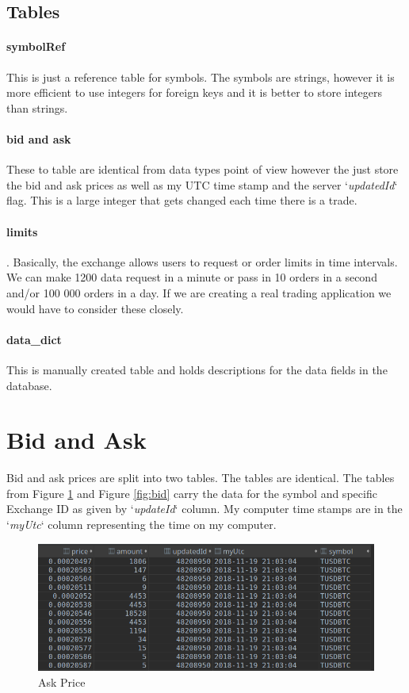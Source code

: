\documentclass[12pt]{article}
\begin{document}
\subsection*{Tables}
\paragraph*{symbolRef} This is just a reference table for symbols. The symbols are strings, however it is more efficient to use integers for foreign keys and it is better to store integers than strings.
\paragraph*{bid and ask} These to table are identical from data types point of view however the just store the bid and ask prices as well as my UTC time stamp and the server `\textit{updatedId}` flag. This is a large integer that gets changed each time there is a trade.
\paragraph*{limits}. Basically, the exchange allows users to request or order limits in time intervals. We can make 1200 data request in a minute or pass in 10 orders in a second and/or 100 000 orders in a day. If we are creating a real trading application we would have to consider these closely.
\paragraph*{data\_dict} This is manually created table and holds descriptions for the data fields in the database.

\section*{Bid and Ask}
Bid and ask prices are split into two tables. The tables are identical. The tables from Figure \ref{fig:ask} and Figure \ref{fig:bid} carry the data for the symbol and specific Exchange ID as given by `\textit{updateId}` column. My computer time stamps are in the `\textit{myUtc}` column representing the time on my computer.

\begin{figure}[h!]
	\centering
  \includegraphics[scale=0.3]{ask.png}
  \caption{Ask Price}
  \label{fig:ask}
\end{figure}
\end{document}
